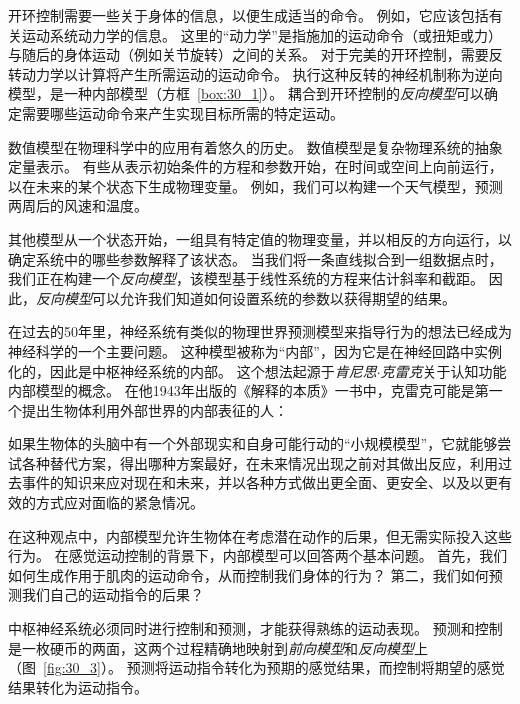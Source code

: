 开环控制需要一些关于身体的信息，以便生成适当的命令。
例如，它应该包括有关运动系统动力学的信息。
这里的“动力学”是指施加的运动命令（或扭矩或力）与随后的身体运动（例如关节旋转）之间的关系。
对于完美的开环控制，需要反转动力学以计算将产生所需运动的运动命令。
执行这种反转的神经机制称为逆向模型，是一种内部模型（方框~\ref{box:30_1}）。
耦合到开环控制的\textit{反向模型}可以确定需要哪些运动命令来产生实现目标所需的特定运动。


\begin{proposition}[内部模型] \label{box:30_1}
	
	\quad \quad 数值模型在物理科学中的应用有着悠久的历史。
	数值模型是复杂物理系统的抽象定量表示。
	有些从表示初始条件的方程和参数开始，在时间或空间上向前运行，以在未来的某个状态下生成物理变量。
	例如，我们可以构建一个天气模型，预测两周后的风速和温度。
	
	\quad \quad 其他模型从一个状态开始，一组具有特定值的物理变量，并以相反的方向运行，以确定系统中的哪些参数解释了该状态。
	当我们将一条直线拟合到一组数据点时，我们正在构建一个\textit{反向模型}，该模型基于线性系统的方程来估计斜率和截距。
	因此，\textit{反向模型}可以允许我们知道如何设置系统的参数以获得期望的结果。
	
	\quad \quad 在过去的50年里，神经系统有类似的物理世界预测模型来指导行为的想法已经成为神经科学的一个主要问题。
	这种模型被称为“内部”，因为它是在神经回路中实例化的，因此是中枢神经系统的内部。
	这个想法起源于\textit{肯尼思$\cdot$克雷克}关于认知功能内部模型的概念。
	在他1943年出版的《解释的本质》一书中，克雷克可能是第一个提出生物体利用外部世界的内部表征的人：
	
	\quad \quad 如果生物体的头脑中有一个外部现实和自身可能行动的“小规模模型”，它就能够尝试各种替代方案，得出哪种方案最好，在未来情况出现之前对其做出反应，利用过去事件的知识来应对现在和未来，并以各种方式做出更全面、更安全、以及以更有效的方式应对面临的紧急情况。
	
	\quad \quad 在这种观点中，内部模型允许生物体在考虑潜在动作的后果，但无需实际投入这些行为。
	在感觉运动控制的背景下，内部模型可以回答两个基本问题。
	首先，我们如何生成作用于肌肉的运动命令，从而控制我们身体的行为？
	第二，我们如何预测我们自己的运动指令的后果？
	
	\quad \quad 中枢神经系统必须同时进行控制和预测，才能获得熟练的运动表现。
	预测和控制是一枚硬币的两面，这两个过程精确地映射到\textit{前向模型}和\textit{反向模型}上（图~\ref{fig:30_3}）。
	预测将运动指令转化为预期的感觉结果，而控制将期望的感觉结果转化为运动指令。
	
\end{proposition}


